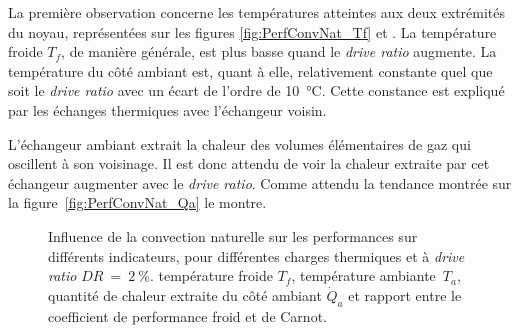 La première observation concerne les températures atteintes aux deux extrémités du noyau, représentées sur les figures \ref{fig:PerfConvNat_Tf} et . La température froide $T_f$, de manière générale, est plus basse quand le \textit{drive ratio} augmente. La température du côté ambiant est, quant à elle, relativement constante quel que soit le \textit{drive ratio} avec un écart de l'ordre de \qty{10}{\degreeCelsius}. Cette constance est expliqué par les échanges thermiques avec l'échangeur voisin.\smallskip

L'échangeur ambiant extrait la chaleur des volumes élémentaires de gaz qui oscillent à son voisinage. Il est donc attendu de voir la chaleur extraite par cet échangeur augmenter avec le \textit{drive ratio}. Comme attendu la tendance montrée sur la figure~\ref{fig:PerfConvNat_Qa} le montre. 


\begin{figure}[!ht]
    \centering
	\begin{subfigure}[b]{.48\textwidth}
		\centering
        
		\caption{}
		\label{fig:PerfConvNat_Tf_DR2}
	\end{subfigure}		
	\begin{subfigure}[b]{.48\textwidth}
		\centering
        
		\caption{}
		\label{fig:PerfConvNat_Ta_DR2}
	\end{subfigure}
	
	\begin{subfigure}[b]{.48\textwidth}
		\centering
        
		\caption{}
		\label{fig:PerfConvNat_Qa_DR2}
	\end{subfigure}	
	\begin{subfigure}[b]{.48\textwidth}
		\centering
        
		\caption{}
		\label{fig:PerfConvNat_COP_DR2}
	\end{subfigure}	      
    \caption{Influence de la convection naturelle sur les performances sur différents indicateurs, pour différentes charges thermiques et à \textit{drive ratio} $DR~=~\qty{2}{\percent}$.  température froide $T_f$,  température ambiante~$T_a$,  quantité de chaleur extraite du côté ambiant $\dot Q_a$ et  rapport entre le coefficient de performance froid et de Carnot. }
    \label{fig:PerfConvNat_DR2}
\end{figure}

